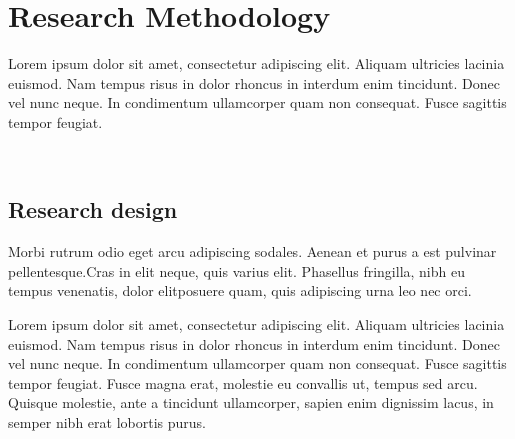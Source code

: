 \chapter{Research Methodology}
\label{Chapter2} %

\noindent Lorem ipsum dolor sit amet, consectetur adipiscing elit. Aliquam ultricies lacinia euismod. Nam tempus risus in dolor rhoncus in interdum enim tincidunt. Donec vel nunc neque. In condimentum ullamcorper quam non consequat. Fusce sagittis tempor feugiat.
\par\vspace{0.5cm}
\noindent {}\\

\section{Research design}

\noindent Morbi rutrum odio eget arcu adipiscing sodales. Aenean et purus a est pulvinar pellentesque.Cras in elit neque,  quis varius elit.   Phasellus fringilla,  nibh eu tempus venenatis,  dolor elitposuere quam, quis adipiscing urna leo nec orci.  
\par Lorem ipsum dolor sit amet, consectetur adipiscing elit. Aliquam ultricies lacinia euismod. Nam tempus risus in dolor rhoncus in interdum enim tincidunt. Donec vel nunc neque. In condimentum ullamcorper quam non consequat. Fusce sagittis tempor feugiat. Fusce magna erat, molestie eu convallis ut, tempus sed arcu. Quisque molestie, ante a tincidunt ullamcorper, sapien enim dignissim lacus, in semper nibh erat lobortis purus. 

\par\vspace{0.5cm}
\noindent {}\\

